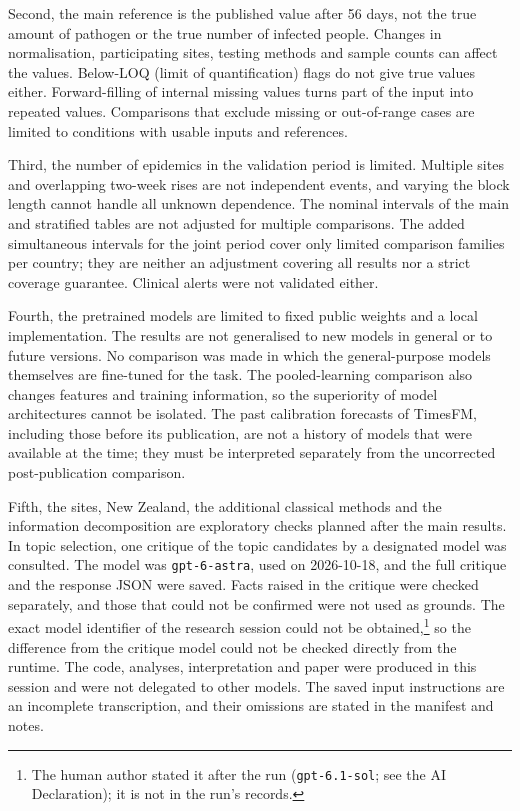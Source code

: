 \documentclass[11pt]{article}
\begin{document}
Second, the main reference is the published value after 56 days, not the true amount of pathogen or the true number of infected people. Changes in normalisation, participating sites, testing methods and sample counts can affect the values. Below-LOQ (limit of quantification) flags do not give true values either. Forward-filling of internal missing values turns part of the input into repeated values. Comparisons that exclude missing or out-of-range cases are limited to conditions with usable inputs and references.

Third, the number of epidemics in the validation period is limited. Multiple sites and overlapping two-week rises are not independent events, and varying the block length cannot handle all unknown dependence. The nominal intervals of the main and stratified tables are not adjusted for multiple comparisons. The added simultaneous intervals for the joint period cover only limited comparison families per country; they are neither an adjustment covering all results nor a strict coverage guarantee. Clinical alerts were not validated either.

Fourth, the pretrained models are limited to fixed public weights and a local implementation. The results are not generalised to new models in general or to future versions. No comparison was made in which the general-purpose models themselves are fine-tuned for the task. The pooled-learning comparison also changes features and training information, so the superiority of model architectures cannot be isolated. The past calibration forecasts of TimesFM, including those before its publication, are not a history of models that were available at the time; they must be interpreted separately from the uncorrected post-publication comparison.

Fifth, the sites, New Zealand, the additional classical methods and the information decomposition are exploratory checks planned after the main results. In topic selection, one critique of the topic candidates by a designated model was consulted. The model was \texttt{gpt-6-astra}, used on 2026-10-18, and the full critique and the response JSON were saved. Facts raised in the critique were checked separately, and those that could not be confirmed were not used as grounds. The exact model identifier of the research session could not be obtained,\footnote{The human author stated it after the run (\texttt{gpt-6.1-sol}; see the AI Declaration); it is not in the run's records.} so the difference from the critique model could not be checked directly from the runtime. The code, analyses, interpretation and paper were produced in this session and were not delegated to other models. The saved input instructions are an incomplete transcription, and their omissions are stated in the manifest and notes.
\end{document}
